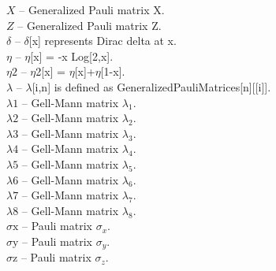\documentclass[a4paper,10pt]{scrartcl}
\begin{document}
\textbf{$ X $ }-- Generalized Pauli matrix X.$  $\\

\textbf{$ Z $ }-- Generalized Pauli matrix Z.$  $\\

\textbf{$ \delta  $ }-- $\delta $[x] represents Dirac delta at x.$  $\\

\textbf{$ \eta  $ }-- $\eta $[x] = -x Log[2,x].$  $\\

\textbf{$ \text{$\eta $2} $ }-- $\eta $2[x] = $\eta $[x]+$\eta $[1-x].$  $\\

\textbf{$ \lambda  $ }-- $\lambda $[i,n] is defined as GeneralizedPauliMatrices[n][[i]].$  $\\

\textbf{$ \text{$\lambda $1} $ }-- Gell-Mann matrix $ \lambda _1. $\\

\textbf{$ \text{$\lambda $2} $ }-- Gell-Mann matrix $ \lambda _2. $\\

\textbf{$ \text{$\lambda $3} $ }-- Gell-Mann matrix $ \lambda _3. $\\

\textbf{$ \text{$\lambda $4} $ }-- Gell-Mann matrix $ \lambda _4. $\\

\textbf{$ \text{$\lambda $5} $ }-- Gell-Mann matrix $ \lambda _5. $\\

\textbf{$ \text{$\lambda $6} $ }-- Gell-Mann matrix $ \lambda _6. $\\

\textbf{$ \text{$\lambda $7} $ }-- Gell-Mann matrix $ \lambda _7. $\\

\textbf{$ \text{$\lambda $8} $ }-- Gell-Mann matrix $ \lambda _8. $\\

\textbf{$ \text{$\sigma $x} $ }-- Pauli matrix $ \sigma _x. $\\

\textbf{$ \text{$\sigma $y} $ }-- Pauli matrix $ \sigma _y. $\\

\textbf{$ \text{$\sigma $z} $ }-- Pauli matrix $ \sigma _z. $\\
\end{document}
